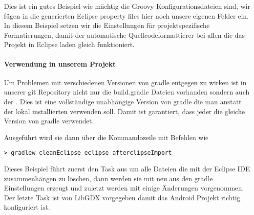 Dies ist ein gutes Beispiel wie mächtig die Groovy Konfigurationsdateien sind, wir fügen in die generierten Eclipse property files hier noch unsere eigenen Felder ein.
In diesem Beispiel setzen wir die Einstellungen für projektspezifische Formatierungen, damit der automatische Quellcodeformattierer bei allen die das Projekt in Eclipse laden gleich funktioniert.

\paragraph{Verwendung in unserem Projekt}

Um Problemen mit verschiedenen Versionen von gradle entgegen zu wirken ist in unserer git Repository nicht nur die build.gradle Dateien vorhanden sondern auch der . Dies ist eine vollständige unabhängige Version von gradle die man anstatt der lokal installierten verwenden soll. Damit ist garantiert, dass jeder die gleiche Version von gradle verwendet.

Ausgeführt wird sie dann über die Kommandozeile mit Befehlen wie

\begin{lstlisting}[caption=Gradle in der Kommandozeile, title=\hspace{0 pt}, style=cmd]
> gradlew cleanEclipse eclipse afterclipseImport
\end{lstlisting}

Dieses Beispiel führt zuerst den Task  aus um alle Dateien die mit der Eclipse IDE zusammenhängen zu löschen, dann werden sie mit  neu aus den gradle Einstellungen erzeugt und zuletzt werden mit  einige Änderungen vorgenommen. Der letzte Task ist von LibGDX vorgegeben damit das Android Projekt richtig konfiguriert ist.
